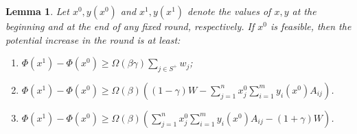 \documentclass[11pt]{article}
\newtheorem{lemma}[theorem]{Lemma}
\begin{document}
\begin{lemma}\label{lemma:potential-increase-proportional}
Let $x^0, y(x^0)$ and $x^1, y(x^1)$ denote the values of $x, y$ at the beginning and at the end of any fixed round, respectively. If $x^0$ is feasible, then the potential increase in the round is at least:
\begin{enumerate}
\item \label{item:prop-1} $\Phi(x^1) - \Phi(x^0) \geq \Omega(\beta\gamma)\sum_{j\in S^+} w_j$;
\item \label{item:prop-2} $\Phi(x^1) - \Phi(x^0) \geq \Omega(\beta)\left((1-\gamma)W - \sum_{j=1}^nx_j^0\sum_{i=1}^m y_i(x^0) A_{ij}\right)$.
\item \label{item:prop-3} $\Phi(x^1) - \Phi(x^0) \geq \Omega(\beta)\left(\sum_{j=1}^nx_j^0\sum_{i=1}^m y_i(x^0) A_{ij} - (1+\gamma)W\right)$.
\end{enumerate}
\end{lemma}
\end{document}
